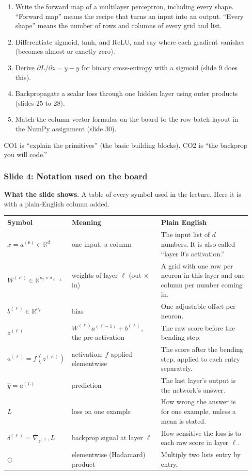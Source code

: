 \begin{enumerate}
\item Write the forward map of a multilayer perceptron, including every shape. ``Forward map'' means the recipe that turns an input into an output. ``Every shape'' means the number of rows and columns of every grid and list.
\item Differentiate sigmoid, tanh, and ReLU, and say where each gradient vanishes (becomes almost or exactly zero).
\item Derive $\partial L/\partial z = \hat{y} - y$ for binary cross-entropy with a sigmoid (slide 9 does this).
\item Backpropagate a scalar loss through one hidden layer using outer products (slides 25 to 28).
\item Match the column-vector formulas on the board to the row-batch layout in the NumPy assignment (slide 30).
\end{enumerate}

CO1 is ``explain the primitives'' (the basic building blocks). CO2 is ``the backprop you will code.''

\subsubsection{Slide 4: Notation used on the board}

\textbf{What the slide shows.} A table of every symbol used in the lecture. Here it is with a plain-English column added.

\begin{center}
\begin{tabular}{p{3.0cm}p{4.2cm}p{6.8cm}}
\toprule
Symbol & Meaning & Plain English \\
\midrule
$x = a^{(0)} \in \mathbb{R}^d$ & one input, a column & The input list of $d$ numbers. It is also called ``layer 0's activation.'' \\
$W^{(\ell)} \in \mathbb{R}^{n_\ell \times n_{\ell-1}}$ & weights of layer $\ell$ (out $\times$ in) & A grid with one row per neuron in this layer and one column per number coming in. \\
$b^{(\ell)} \in \mathbb{R}^{n_\ell}$ & bias & One adjustable offset per neuron. \\
$z^{(\ell)}$ & $W^{(\ell)}a^{(\ell-1)} + b^{(\ell)}$, the pre-activation & The raw score before the bending step. \\
$a^{(\ell)} = f(z^{(\ell)})$ & activation; $f$ applied elementwise & The score after the bending step, applied to each entry separately. \\
$\hat{y} = a^{(L)}$ & prediction & The last layer's output is the network's answer. \\
$L$ & loss on one example & How wrong the answer is for one example, unless a mean is stated. \\
$\delta^{(\ell)} = \nabla_{z^{(\ell)}} L$ & backprop signal at layer $\ell$ & How sensitive the loss is to each raw score in layer $\ell$. \\
$\odot$ & elementwise (Hadamard) product & Multiply two lists entry by entry. \\
\bottomrule
\end{tabular}
\end{center}

